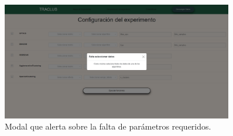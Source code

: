 \begin{figure}[H]
    \centering
    \includegraphics[width=0.9\textwidth]{img/webpage/Modal_2.png}
    \caption{Modal que alerta sobre la falta de parámetros requeridos.}
\end{figure}


